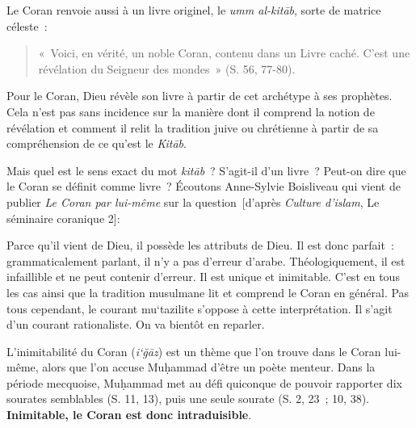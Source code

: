 Le Coran renvoie aussi à un livre originel, le \emph{umm al-kitāb},
sorte de matrice céleste~:
\begin{quote}
    

«~Voici, en vérité, un noble Coran, contenu dans un Livre caché. C'est
une révélation du Seigneur des mondes~» (S. 56, 77-80).
\end{quote}
Pour le Coran, Dieu révèle son livre à partir de cet archétype à ses
prophètes. Cela n'est pas sans incidence sur la manière dont il comprend
la notion de révélation et comment il relit la tradition juive ou
chrétienne à partir de sa compréhension de ce qu'est le \emph{Kitāb}.

Mais quel est le sens exact du mot \emph{kitāb}~? S'agit-il d'un livre~?
Peut-on dire que le Coran se définit comme livre~? Écoutons Anne-Sylvie
Boisliveau qui vient de publier \emph{Le Coran par lui-même} sur la
question~{[}d'après \emph{Culture d'islam}, Le séminaire coranique 2{]}:






Parce qu'il vient de Dieu, il possède les attributs de Dieu. Il est donc
parfait~: grammaticalement parlant, il n'y a pas d'erreur d'arabe.
Théologiquement, il est infaillible et ne peut contenir d'erreur. Il est
unique et inimitable. C'est en tous les cas ainsi que la tradition
musulmane lit et comprend le Coran en général. Pas tous cependant, le
courant mu`tazilite s'oppose à cette interprétation. Il s'agit d'un
courant rationaliste. On va bientôt en reparler.

L'inimitabilité du Coran (\emph{i`ğāz}) est un thème que l'on trouve
dans le Coran lui-même, alors que l'on accuse Muḥammad d'être un poète
menteur. Dans la période mecquoise, Muḥammad met au défi quiconque de
pouvoir rapporter dix sourates semblables (S. 11, 13), puis une seule
sourate (S. 2, 23~; 10, 38). \textbf{Inimitable, le Coran est donc
intraduisible}.

